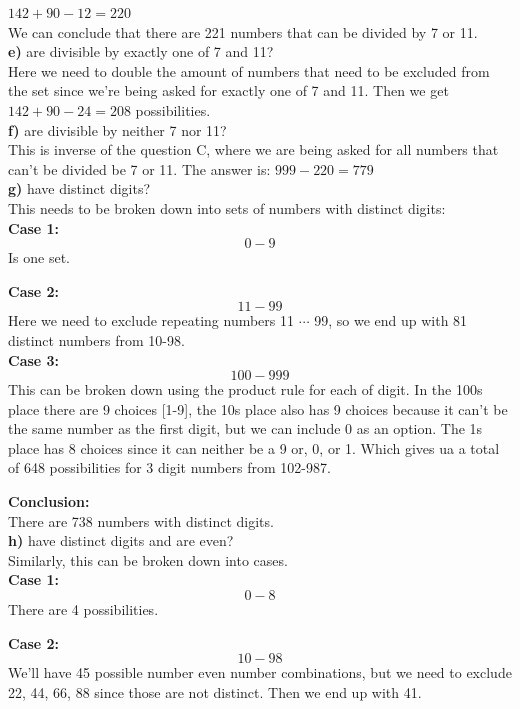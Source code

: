 \documentclass[paper=a4, fontsize=11pt]{scrartcl} %
\begin{document}
$142 + 90 - 12 = 220$\\
We can conclude that there are 221 numbers that can be divided by 7 or 11. \\

\textbf{e)} are divisible by exactly one of 7 and 11?\\
Here we need to double the amount of numbers that need to be excluded from the set since we're being asked for exactly one of 7 and 11. Then we get $142+90-24 = 208$ possibilities.\\

\textbf{f)} are divisible by neither 7 nor 11?\\
This is inverse of the question C, where we are being asked for all numbers that can't be divided be 7 or 11. The answer is: $999-220 = 779$\\

\textbf{g)} have distinct digits?\\
This needs to be broken down into sets of numbers with distinct digits:\\

\textbf{Case 1:}\\
\[0-9\] Is one set. 

\textbf{Case 2:}\\
\[11-99\] Here we need to exclude repeating numbers 11 $\cdots$ 99, so we end up with 81 distinct numbers from 10-98.\\

\textbf{Case 3:}\\
\[100-999\] This can be broken down using the product rule for each of digit. In the 100s place there are 9 choices [1-9], the 10s place also has 9 choices because it can't be the same number as the first digit, but we can include 0 as an option. The 1s place has 8 choices since it can neither be a 9 or, 0, or 1. Which gives ua a total of 648 possibilities for 3 digit numbers from 102-987.

\textbf{Conclusion:}\\
There are 738 numbers with distinct digits.\\

\textbf{h)} have distinct digits and are even?\\
Similarly, this can be broken down into cases.\\

\textbf{Case 1:}\\
\[0-8\] There are 4 possibilities.

\textbf{Case 2:}\\
\[10-98\] We'll have 45 possible number even number combinations, but we need to exclude 22, 44, 66, 88 since those are not distinct. Then we end up with 41. 
\end{document}
